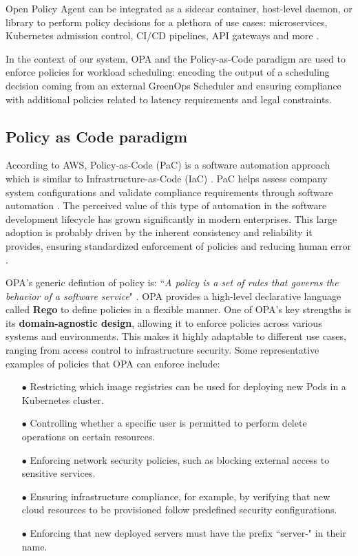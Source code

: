 Open Policy Agent can be integrated as a sidecar container, host-level daemon, or library to perform policy decisions for a plethora of use cases: microservices, Kubernetes admission control, CI/CD pipelines, API gateways and more \cite{opa_docs}. 

In the context of our system, OPA and the Policy-as-Code paradigm are used to enforce policies for workload scheduling: encoding the output of a scheduling decision coming from an external GreenOps Scheduler and ensuring compliance with additional policies related to latency requirements and legal constraints.

\subsection{Policy as Code paradigm}

According to AWS, Policy-as-Code (PaC) is a software automation approach which is similar to Infrastructure-as-Code (IaC) \cite{pac_aws}. PaC helps assess company system configurations and validate compliance requirements through software automation \cite{pac_aws}. The perceived value of this type of automation in the software development lifecycle has grown significantly in modern enterprises. This large adoption is probably driven by the inherent consistency and reliability it provides, ensuring standardized enforcement of policies and reducing human error \cite{pac_aws}.

OPA's generic defintion of policy is: ``\textit{A policy is a set of rules that governs the behavior of a software service}" \cite{opa_philosophy}. OPA provides a high-level declarative language called \textbf{Rego} to define policies in a flexible manner. One of OPA's key strengths is its \textbf{domain-agnostic design}, allowing it to enforce policies across various systems and environments. This makes it highly adaptable to different use cases, ranging from access control to infrastructure security. Some representative examples of policies that OPA can enforce include:

\begin{itemize}[itemsep=0.2pt, topsep=1pt] \item[$\bullet$] Restricting which image registries can be used for deploying new Pods in a Kubernetes cluster.
\item[$\bullet$] Controlling whether a specific user is permitted to perform delete operations on certain resources.
\item[$\bullet$] Enforcing network security policies, such as blocking external access to sensitive services.
\item[$\bullet$] Ensuring infrastructure compliance, for example, by verifying that new cloud resources to be provisioned follow predefined security configurations.
\item[$\bullet$] Enforcing that new deployed servers must have the prefix ``server-" in their name.
\end{itemize}

